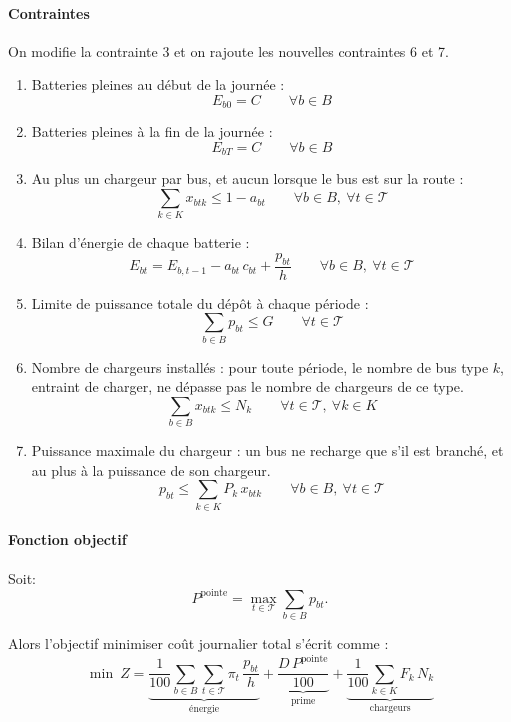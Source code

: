 \documentclass{article}
\begin{document}
\paragraph{Contraintes}
On modifie la contrainte 3 et on rajoute les nouvelles contraintes 6 et 7. 
\begin{enumerate}
  \item  Batteries pleines au début de la journée :
  \[ E_{b0} = C \qquad \forall b \in B \]

  \item  Batteries pleines à la fin de la journée :
  \[ E_{bT} = C \qquad \forall b \in B \]

  \item  Au plus un chargeur par bus, et aucun lorsque le bus est sur la route :
  \[ \sum_{k \in K} x_{btk} \leq 1 - a_{bt} \qquad \forall b \in B,\ \forall t \in \mathcal{T} \]

  \item  Bilan d'énergie de chaque batterie :
  \[ E_{bt} = E_{b,t-1} - a_{bt}\,c_{bt} + \frac{p_{bt}}{h} \qquad \forall b \in B,\ \forall t \in \mathcal{T} \]

  \item  Limite de puissance totale du dépôt à chaque période :
  \[ \sum_{b \in B} p_{bt} \leq G \qquad \forall t \in \mathcal{T} \]

  \item Nombre de chargeurs installés : pour toute période, le nombre de bus type $k$, entraint de charger, ne dépasse pas le nombre de chargeurs de ce type.
  \[ \sum_{b \in B} x_{btk} \leq N_k \qquad \forall t \in \mathcal{T},\ \forall k \in K \]

  \item Puissance maximale du chargeur : un bus ne recharge que s'il est branché, et au plus à la puissance de son chargeur.
  \[ p_{bt} \leq \sum_{k \in K} P_k\, x_{btk} \qquad \forall b \in B,\ \forall t \in \mathcal{T} \]
\end{enumerate}

\paragraph{Fonction objectif}

Soit:
\[ P^{\text{pointe}} = \max_{t \in \mathcal{T}} \sum_{b \in B} p_{bt}. \]


Alors l'objectif minimiser coût journalier total s'écrit comme :
\[ \min\ Z =
   \underbrace{\frac{1}{100} \sum_{b \in B} \sum_{t \in \mathcal{T}} \pi_t \, \frac{p_{bt}}{h}}_{\text{énergie}}
   + \underbrace{\frac{D \, P^{\text{pointe}}}{100}}_{\text{prime}}
   + \underbrace{\frac{1}{100} \sum_{k \in K} F_k \, N_k}_{\text{chargeurs}} \]
\end{document}

